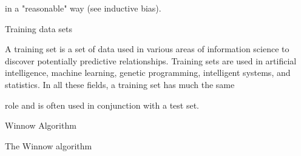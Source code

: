 in a "reasonable" way (see inductive bias). 

Training data sets

A training set is a set of data used in various areas of information science to discover potentially predictive relationships. Training sets are used in artificial intelligence, machine learning, genetic programming, intelligent systems, and statistics. In all these fields, a training set has much the same 

role and is often used in conjunction with a test set.


 

Winnow Algorithm

The Winnow algorithm



 


